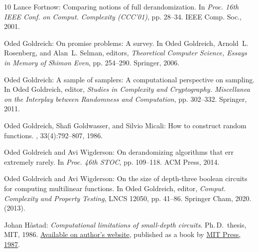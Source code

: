 \documentclass[11pt]{article}
\numberwithin{equation}{section}
\theoremstyle{definition}
\theoremstyle{plain}
\begin{document}
\begin{thebibliography}{10}
{\sc Lance Fortnow}: Comparing notions of full derandomization.
\newblock In {\em Proc. 16th IEEE Conf. on Comput. Complexity (CCC'01)}, pp.
  28--34. IEEE Comp. Soc., 2001.

{\sc Oded Goldreich}: On promise problems: {A} survey.
\newblock In {\sc Oded Goldreich, Arnold~L. Rosenberg, and Alan~L. Selman},
  editors, {\em Theoretical Computer Science, Essays in Memory of Shimon Even},
  pp. 254--290. Springer, 2006.
\newblock [\epfmtdoi{10.1007/11685654\_12}]

{\sc Oded Goldreich}: A sample of samplers: {A} computational perspective on
  sampling.
\newblock In {\sc Oded Goldreich}, editor, {\em Studies in Complexity and
  Cryptography. Miscellanea on the Interplay between Randomness and
  Computation}, pp. 302--332. Springer, 2011.
\newblock [\epfmtdoi{10.1007/978-3-642-22670-0\_24}]

{\sc Oded Goldreich, Shafi Goldwasser, and Silvio Micali}: How to construct
  random functions.
, 33(4):792--807, 1986.
\newblock [\epfmtdoi{10.1145/6490.6503}]

{\sc Oded Goldreich and Avi Wigderson}: On derandomizing algorithms that err
  extremely rarely.
\newblock In {\em Proc. 46th STOC}, pp. 109--118. ACM Press, 2014.
\newblock [\epfmtdoi{10.1145/2591796.2591808}]

{\sc Oded Goldreich and Avi Wigderson}: On the size of depth-three boolean
  circuits for computing multilinear functions.
\newblock In {\sc Oded Goldreich}, editor, {\em Comput. Complexity and Property
  Testing}, LNCS 12050, pp. 41--86. Springer Cham, 2020.
\newblock (2013).

{\sc Johan H{\aa}stad}: {\em Computational limitations of small-depth
  circuits}.
\newblock Ph.\,D.\ thesis, MIT, 1986.
\newblock \href{https://www.csc.kth.se/~johanh/thesis_with_figs.pdf}{Available
  on author's website}, published as a book by
  \href{https://mitpress.mit.edu/9780262081672/computational-limitations-for-small-depth-circuits/}{MIT
  Press, 1987}.


\end{thebibliography}
\end{document}
